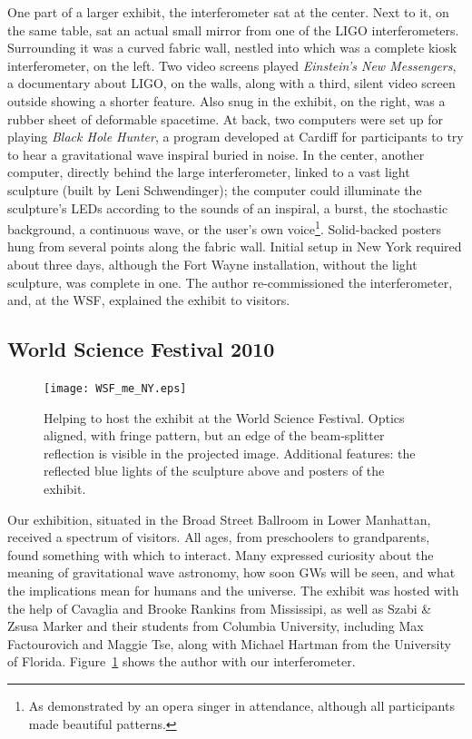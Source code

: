 One part of a larger exhibit, the interferometer sat at the center.
Next to it, on the same table, sat an actual small mirror from one of the LIGO interferometers.
Surrounding it was a curved fabric wall, nestled into which was a complete kiosk interferometer, on the left.
Two video screens played \textit{Einstein's New Messengers}, a documentary about LIGO, on the walls, along with a third, silent video screen outside showing a shorter feature.
Also snug in the exhibit, on the right, was a rubber sheet of deformable spacetime.
At back, two computers were set up for playing \textit{Black Hole Hunter}, a program developed at Cardiff for participants to try to hear a gravitational wave inspiral buried in noise.
In the center, another computer, directly behind the large interferometer, linked to a vast light sculpture (built by Leni Schwendinger); the computer could illuminate the sculpture's LEDs according to the sounds of an inspiral, a burst, the stochastic background, a continuous wave, or the user's own voice\footnote{As demonstrated by an opera singer in attendance, although all participants made beautiful patterns.}.
Solid-backed posters hung from several points along the fabric wall.
Initial setup in New York required about three days, although the Fort Wayne installation, without the light sculpture, was complete in one.
The author re-commissioned the interferometer, and, at the WSF, explained the exhibit to visitors.

        \subsection{World Science Festival 2010}
        \label{WSF2010}


	\begin{figure}
	\begin{center}
	\texttt{[image: WSF\_me\_NY.eps]}
	\caption{Helping to host the exhibit at the World Science Festival. Optics aligned, with fringe pattern, but an edge of the beam-splitter reflection is visible in the projected image. Additional features: the reflected blue lights of the sculpture above and posters of the exhibit.}
	\label{WSF_IFO_me}
	\end{center}
	\end{figure}

Our exhibition, situated in the Broad Street Ballroom in Lower Manhattan, received a spectrum of visitors.
All ages, from preschoolers to grandparents, found something with which to interact.
Many expressed curiosity about the meaning of gravitational wave astronomy, how soon GWs will be seen, and what the implications mean for humans and the universe.
The exhibit was hosted with the help of Cavaglia and Brooke Rankins from Mississipi, as well as Szabi \& Zsusa Marker and their students from Columbia University, including Max Factourovich and Maggie Tse, along with Michael Hartman from the University of Florida.
Figure~\ref{WSF_IFO_me} shows the author with our interferometer.

